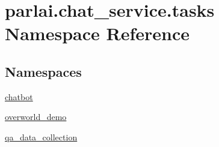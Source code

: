\hypertarget{namespaceparlai_1_1chat__service_1_1tasks}{}\section{parlai.\+chat\+\_\+service.\+tasks Namespace Reference}
\label{namespaceparlai_1_1chat__service_1_1tasks}
\subsection*{Namespaces}
\begin{DoxyCompactItemize}
\item 
 \hyperlink{namespaceparlai_1_1chat__service_1_1tasks_1_1chatbot}{chatbot}
\item 
 \hyperlink{namespaceparlai_1_1chat__service_1_1tasks_1_1overworld__demo}{overworld\+\_\+demo}
\item 
 \hyperlink{namespaceparlai_1_1chat__service_1_1tasks_1_1qa__data__collection}{qa\+\_\+data\+\_\+collection}
\end{DoxyCompactItemize}

